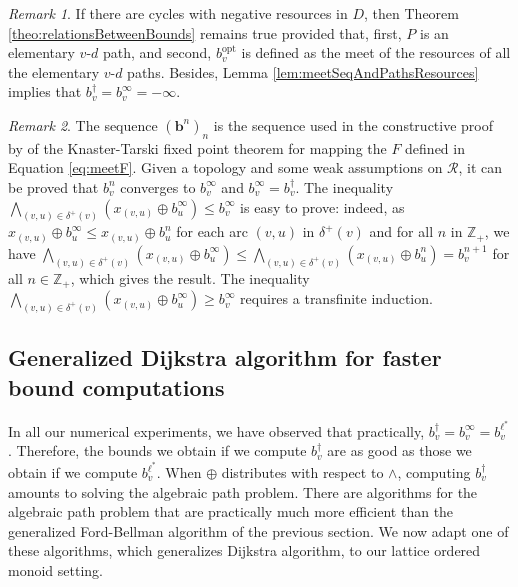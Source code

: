 \documentclass[11pt]{amsart}
\theoremstyle{plain}
\theoremstyle{remark}
\newtheorem{rem}{Remark}
\newcommand{\rplus}{\oplus}
\newcommand{\rleq}{\leqslant}
\newcommand{\rgeq}{\geqslant}
\newcommand{\rset}{\mathcal{R}}
\newcommand{\re}{x}
\newcommand{\meet}{\wedge} \newcommand{\bigmeet}{\bigwedge}
\begin{document}
\begin{rem}
If there are cycles with negative resources in $D$, then Theorem \ref{theo:relationsBetweenBounds} remains true provided that, first, $P$ is an elementary $v$-$d$ path, and second, $b_{v}^{\mathrm{opt}}$ is defined as the meet of the resources of all the elementary $v$-$d$ paths.
Besides, Lemma \ref{lem:meetSeqAndPathsResources} implies that $b_{v}^{\dagger} = b_{v}^{\infty} = - \infty$.
\end{rem}

\begin{rem}\label{rem:cousotSequence}
The sequence $\left(\mathbf{b}^{n}\right)_{n}$ is the sequence used in the constructive proof by \citet{cousot1979constructive} of the Knaster-Tarski fixed point theorem for mapping the $F$ defined in Equation \eqref{eq:meetF}. Given a topology and some weak assumptions on $\rset$, it can be proved that $b_{v}^{n}$ converges to $b_{v}^{\infty}$ and $b_{v}^{\infty} = b_{v}^{\dagger}$. The inequality $\bigmeet_{(v,u)\in \delta^{+}(v)}(\re_{(v,u)} \rplus b_{u}^{\infty}) \rleq b_{v}^{\infty}$ is easy to prove: indeed, as $\re_{(v,u)} \rplus b_{u}^{\infty} \rleq \re_{(v,u)} \rplus b_{u}^{n}$ for each arc $(v,u) $ in $ \delta^{+}(v)$ and for all $n$ in $\mathbb{Z}_{+}$, we have  $\bigmeet_{(v,u)\in \delta^{+}(v)}(\re_{(v,u)} \rplus b_{u}^{\infty}) \rleq \bigmeet_{(v,u)\in \delta^{+}(v)}(\re_{(v,u)} \rplus b_{u}^{n}) = b_{v}^{n+1}$ for all $n \in \mathbb{Z}_{+}$, which gives the result. The inequality $\bigmeet_{(v,u)\in \delta^{+}(v)}(\re_{(v,u)} \rplus b_{u}^{\infty}) \rgeq b_{v}^{\infty}$ requires a transfinite induction.
\end{rem}

\subsection{Generalized Dijkstra algorithm for faster bound computations} 
\label{sub:generalizedDijkstra}





In all our numerical experiments, we have observed that practically, $b_{v}^{\dagger} = b_{v}^{\infty} = b_{v}^{\ell^{*}}$. Therefore, the bounds we obtain if we compute $b_{v}^{\dagger}$ are as good as those we obtain if we compute $b_{v}^{\ell^{*}}$. When $\rplus$ distributes with respect to $\meet$, computing $b_{v}^{\dagger}$ amounts to solving the algebraic path problem. There are algorithms for the algebraic path problem that are practically much more efficient than the generalized Ford-Bellman algorithm of the previous section. We now adapt one of these algorithms, which generalizes Dijkstra algorithm, to our lattice ordered monoid setting. 
\end{document}
